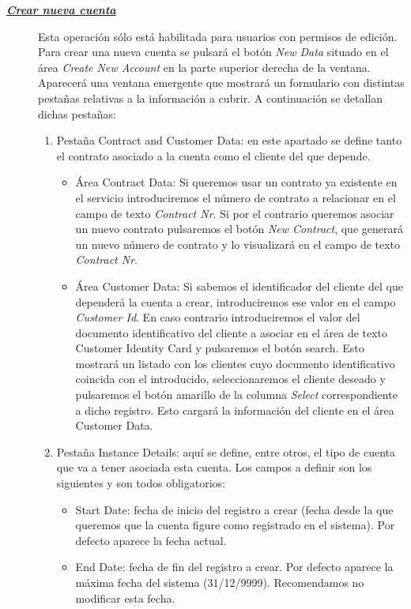 \begin{description}
\item[\underline{\textsl{\textbf{Crear nueva cuenta}}}] Esta operación sólo está habilitada para usuarios con permisos de edición.
Para crear una nueva cuenta se pulsará el botón \textit{New Data} situado en el área \emph{Create New Account} en la parte superior derecha de la ventana. Aparecerá una ventana emergente que mostrará un formulario con distintas pestañas relativas a la información a cubrir. A continuación se detallan dichas pestañas:
\begin{enumerate}
\item Pestaña Contract and Customer Data: en este apartado se define tanto el contrato asociado a la cuenta como el cliente del que depende. 
	\begin{itemize}
		\item Área Contract Data: Si queremos usar un contrato ya existente en el servicio introduciremos el número de contrato a relacionar en el campo de texto \emph{Contract Nr}. Si por el contrario queremos asociar un nuevo contrato pulsaremos el botón \emph{New Contract}, que generará un nuevo número de contrato y lo visualizará en el campo de texto \emph{Contract Nr}.
		\item Área Customer Data: Si sabemos el identificador del cliente del que dependerá la cuenta a crear, introduciremos ese valor en el campo \emph{Customer Id}. En caso contrario introduciremos el valor del documento identificativo del cliente a asociar en el área de texto Customer Identity Card y pulsaremos el botón search. Esto mostrará un listado con los clientes cuyo documento identificativo coincida con el introducido, seleccionaremos el cliente deseado y pulsaremos el botón amarillo de la columna \emph{Select} correspondiente a dicho registro. Esto cargará la información del cliente en el área Customer Data.		
	\end{itemize}		
\item Pestaña Instance Details: aquí se define, entre otros, el tipo de cuenta que va a tener asociada esta cuenta. Los campos a definir son los siguientes y son todos obligatorios:
	\begin{itemize}
	\item Start Date: fecha de inicio del registro a crear (fecha desde la que queremos que la cuenta figure como registrado en el sistema). Por defecto aparece la fecha actual.
	\item End Date: fecha de fin del registro a crear. Por defecto aparece la máxima fecha del sistema (31/12/9999). Recomendamos no modificar esta fecha.

\end{itemize}
\end{enumerate}
\end{description}

